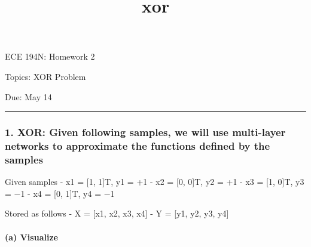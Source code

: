 \documentclass[11pt]{article}
\title{xor}
\begin{document}
    
    
    \maketitle
    
    

    
    ECE 194N: Homework 2

Topics: XOR Problem

Due: May 14

\begin{center}\rule{0.5\linewidth}{\linethickness}\end{center}

\subsubsection{1. XOR: Given following samples, we will use multi-layer
networks to approximate the functions defined by the
samples}\label{xor-given-following-samples-we-will-use-multi-layer-networks-to-approximate-the-functions-defined-by-the-samples}

Given samples - x1 = {[}1, 1{]}T, y1 = +1 - x2 = {[}0, 0{]}T, y2 = +1 -
x3 = {[}1, 0{]}T, y3 = −1 - x4 = {[}0, 1{]}T, y4 = −1

Stored as follows - X = {[}x1, x2, x3, x4{]} - Y = {[}y1, y2, y3, y4{]}

\paragraph{(a) Visualize}\label{a-visualize}
\end{document}
